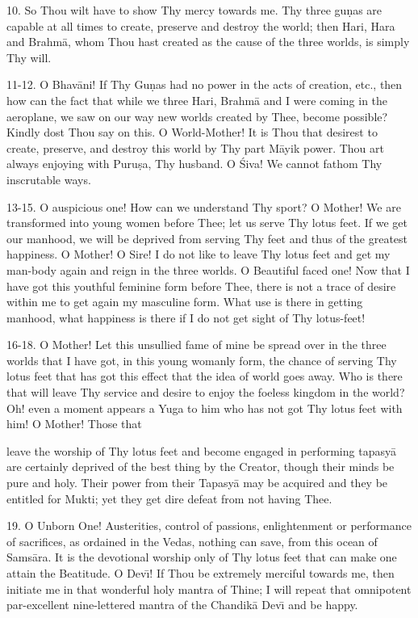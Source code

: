 10. So Thou wilt have to show Thy mercy towards me. Thy three gu\d{n}as are capable at all times to create, preserve and destroy the world; then Hari, Hara and Brahm\=a, whom Thou hast created as the cause of the three worlds, is simply Thy will.

11-12. O Bhav\=ani! If Thy Gu\d{n}as had no power in the acts of creation, etc., then how can the fact that while we three Hari, Brahm\=a and I were coming in the aeroplane, we saw on our way new worlds created by Thee, become possible? Kindly dost Thou say on this. O World-Mother! It is Thou that desirest to create, preserve, and destroy this world by Thy part M\=ayik power. Thou art always enjoying with Puru\d{s}a, Thy husband. O \'Siva! We cannot fathom Thy inscrutable ways.

13-15. O auspicious one! How can we understand Thy sport? O Mother! We are transformed into young women before Thee; let us serve Thy lotus feet. If we get our manhood, we will be deprived from serving Thy feet and thus of the greatest happiness. O Mother! O Sire! I do not like to leave Thy lotus feet and get my man-body again and reign in the three worlds. O Beautiful faced one! Now that I have got this youthful feminine form before Thee, there is not a trace of desire within me to get again my masculine form. What use is there in getting manhood, what happiness is there if I do not get sight of Thy lotus-feet!

16-18. O Mother! Let this unsullied fame of mine be spread over in the three worlds that I have got, in this young womanly form, the chance of serving Thy lotus feet that has got this effect that the idea of world goes away. Who is there that will leave Thy service and desire to enjoy the foeless kingdom in the world? Oh! even a moment appears a Yuga to him who has not got Thy lotus feet with him! O Mother! Those that

leave the worship of Thy lotus feet and become engaged in performing tapasy\=a are certainly deprived of the best thing by the Creator, though their minds be pure and holy. Their power from their Tapasy\=a may be acquired and they be entitled for Mukti; yet they get dire defeat from not having Thee.

19. O Unborn One! Austerities, control of passions, enlightenment or performance of sacrifices, as ordained in the Vedas, nothing can save, from this ocean of Sams\=ara. It is the devotional worship only of Thy lotus feet that can make one attain the Beatitude. O Dev\={\i}! If Thou be extremely merciful towards me, then initiate me in that wonderful holy mantra of Thine; I will repeat that omnipotent par-excellent nine-lettered mantra of the Chandik\=a Dev\={\i} and be happy.

